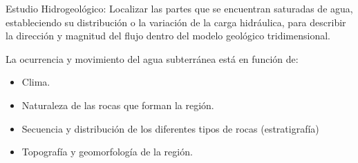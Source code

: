 Estudio Hidrogeológico: Localizar las partes que se encuentran saturadas de agua, estableciendo su distribución o la variación de la carga hidráulica, para describir la dirección y magnitud del flujo dentro del modelo geológico tridimensional.

La ocurrencia y movimiento del agua subterránea está en función de:
\begin{itemize}
    \item Clima.
    \item Naturaleza de las rocas que forman la región.
    \item Secuencia y distribución de los diferentes tipos de rocas (estratigrafía)
    \item Topografía y geomorfología de la región.
\end{itemize}

